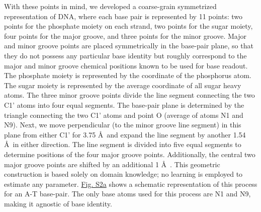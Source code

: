 With these points in mind, we developed a coarse-grain symmetrized representation of DNA, where each base pair is represented by 11 points: two points for the phosphate moiety on each strand, two points for the sugar moiety, four points for the major groove, and three points for the minor groove. Major and minor groove points are placed symmetrically in the base-pair plane, so that they do not possess any particular base identity but roughly correspond to the major and minor groove chemical positions known \citep{Chiu2023} to be used for base readout. The phosphate moiety is represented by the coordinate of the phosphorus atom. The sugar moiety is represented by the average coordinate of all sugar heavy atoms. The three minor groove points divide the line segment connecting the two C1' atoms into four equal segments. The base-pair plane is determined by the triangle connecting the two C1' atoms and point O (average of atoms N1 and N9). Next, we move perpendicular (to the minor groove line segment) in this plane from either C1' for 3.75 \AA\  and expand the line segment by another 1.54 \AA\  in either direction. The line segment is divided into five equal segments to determine positions of the four major groove points. Additionally, the central two major groove points are shifted by an additional 1 \AA\ . This geometric construction is based solely on domain knowledge; no learning is employed to estimate any parameter. \hyperref[fig:pdnaS2]{Fig. S2a} shows a schematic representation of this process for an A-T base-pair. The only base atoms used for this process are N1 and N9, making it agnostic of base identity. 

